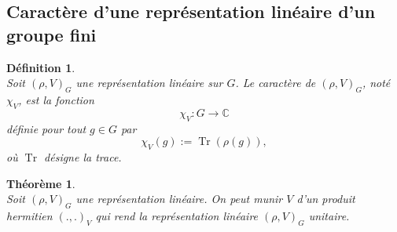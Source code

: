 \documentclass[a4paper, 14pt]{report}
\newtheorem{definition}{Définition}[section]
\newtheorem{theorem}{Théorème}[section]
\begin{document}
\begin{onehalfspace}
{\section{Caractère d'une représentation linéaire d'un groupe fini}
\begin{definition} \cite{serre1971representation} \\
Soit \( (\rho, V)_{G}\) une représentation linéaire sur \( G \). Le caractère de \( (\rho, V)_{G}\), noté \( \chi_V \), est la fonction 
	\[
	\chi_V : G \to \mathbb{C}
	\]
	définie pour tout \( g \in G \) par
	\[
	\chi_V(g) := \operatorname{Tr}(\rho(g)),
	\]
	où \( \operatorname{Tr} \) désigne la trace.
\end{definition}


\begin{theorem} \cite{renard2009groupes}\\
Soit \( (\rho, V)_{G}\) une représentation linéaire. On peut munir \( V \) d’un produit hermitien \( (.,.)_V \) qui rend la représentation linéaire \( (\rho, V)_{G}\) unitaire.\\
\end{theorem}

}
\end{onehalfspace}
\end{document}
